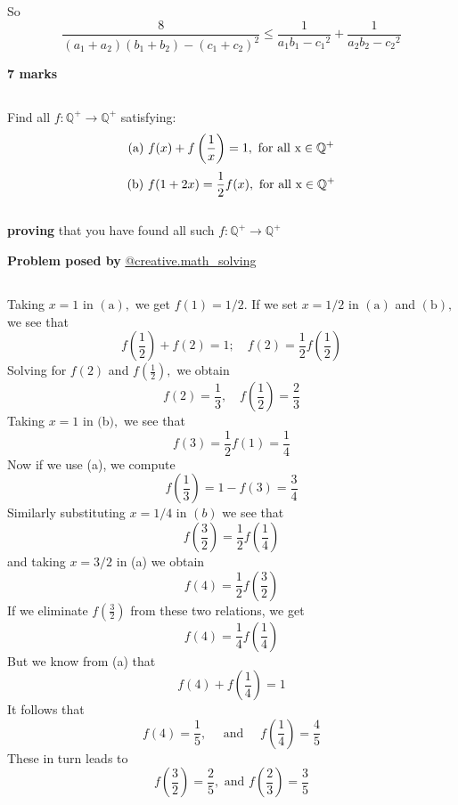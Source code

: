 \documentclass[12pt]{article}
\begin{document}
So $$\frac{8}{(a_1+a_2)(b_1+b_2)-{(c_1+c_2)}^2}\le\frac{1}{a_1b_1-{c_1}^2}+\frac{1}{a_2b_2-{c_2}^2}$$
\begin{flushright}
\textbf{7 marks}
\end{flushright}

\subsection*{}
Find all $f: \mathbb{Q}^{+} \rightarrow \mathbb{Q}^{+}$ satisfying:
 $$ \textmd{(a) } f(x)+f\left(\frac{1}{x}\right)=1, \textmd{ for all x} \in \mathbb{Q}^{+}$$ 
  $$ \textmd{(b) }f(1+2 x)=\frac{1}{2} f(x), \textmd{ for all x} \in \mathbb{Q}^{+}$$ \\
\textbf{proving} that you have found all such $f : \mathbb{Q}^{+} \rightarrow \mathbb{Q}^{+}$





\begin{flushright}
\textbf{Problem posed by} 
\textcolor{RoyalBlue2}{\href{https://www.instagram.com/creative.math_solving/}{@creative.math\_solving}}
\end{flushright}








\subsection*{}
Taking $x=1$ in $(\mathrm{a}),$ we get $f(1)=1 / 2$. If we set $x=1 / 2$ in $(\mathrm{a})$ and $(\mathrm{b}),$ we see that
$$
f\left(\frac{1}{2}\right)+f(2)=1 ;\quad f(2)=\frac{1}{2} f\left(\frac{1}{2}\right)
$$
Solving for $f(2)$ and $f\left(\frac{1}{2}\right),$ we obtain
$$
f(2)=\frac{1}{3},\quad f\left(\frac{1}{2}\right)=\frac{2}{3}
$$
Taking $x=1$ in $($b$),$ we see that
$$
f(3)=\frac{1}{2} f(1)=\frac{1}{4}
$$
Now if we use (a), we compute
$$
f\left(\frac{1}{3}\right)=1-f(3)=\frac{3}{4}
$$
Similarly substituting $x=1 / 4$ in $(b)$ we see that
$$
f\left(\frac{3}{2}\right)=\frac{1}{2} f\left(\frac{1}{4}\right)
$$and taking $x=3 / 2$ in (a) we obtain
$$
f(4)=\frac{1}{2} f\left(\frac{3}{2}\right)
$$
If we eliminate $f\left(\frac{3}{2}\right)$ from these two relations, we get
$$
f(4)=\frac{1}{4} f\left(\frac{1}{4}\right)
$$
But we know from (a) that
$$
f(4)+f\left(\frac{1}{4}\right)=1
$$
It follows that
$$
f(4)=\frac{1}{5}, \quad \text { and } \quad f\left(\frac{1}{4}\right)=\frac{4}{5}
$$
These in turn leads to
$$
f\left(\frac{3}{2}\right)=\frac{2}{5}, \text { and } f\left(\frac{2}{3}\right)=\frac{3}{5}
$$
\end{document}
